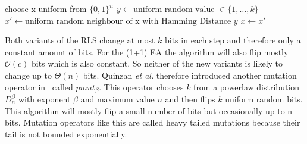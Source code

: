 \begin{algorithm}[bt]
      \caption{\textsc{\RLSR}}\label{alg:rlsR}

      \DontPrintSemicolon %

      \BlankLine
      choose x uniform from ${\{0,1\}}^n$\;
      {
      $y \leftarrow \text{uniform random value }\in \{1,\dots,k\}$\;
      $x' \leftarrow \text{uniform random neighbour of x with Hamming Distance } y$\;
      {
      {
            $x \leftarrow x'$\;
      }
      }
      }
\end{algorithm}

Both variants of the RLS change at most $k$ bits in each step and therefore only a constant amount of bits.
For the (1+1) EA the algorithm will also flip mostly $\mathcal{O}(c)$ bits which is also constant.
So neither of the new variants is likely to change up to $\Theta(n)$ bits.
Quinzan \textit{et al.} therefore introduced another mutation operator in~\cite{friedrich2018evolutionary} called $pmut_\beta$.
This operator chooses $k$ from a powerlaw distribution $D^\beta_n$ with exponent $\beta$ and maximum value $n$ and then flips $k$ uniform random bits.
This algorithm will mostly flip a small number of bits but occasionally up to n bits.
Mutation operators like this are called heavy tailed mutations because their tail is not bounded exponentially.